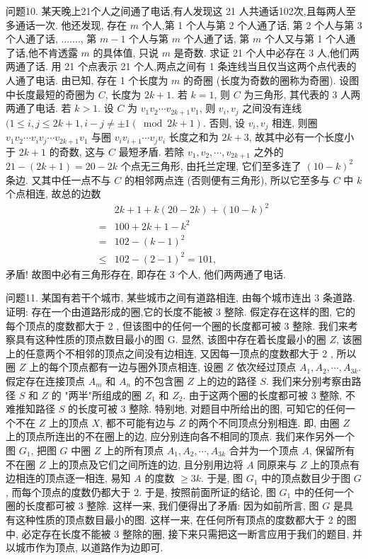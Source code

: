 问题10. 某天晚上21个人之间通了电话,有人发现这 21 人共通话102次,且每两人至多通话一次.
他还发现, 存在 $m$ 个人,第 1 个人与第 2 个人通了话, 第 2 个人与第 3 个人通了话, ......., 第 $m-1$ 个人与第 $m$ 个人通了话, 第 $m$ 个人又与第 1 个人通了话,他不肯透露 $m$ 的具体值, 只说 $m$ 是奇数.
求证 21 个人中必存在 3 人,他们两两通了话.
用 21 个点表示 21 个人,两点之间有 1 条连线当且仅当这两个点代表的人通了电话.
由已知, 存在 1 个长度为 $m$ 的奇圈 (长度为奇数的圈称为奇圈). 设图中长度最短的奇圈为 $C$, 长度为 $2 k+1$.
若 $k=1$, 则 $C$ 为三角形, 其代表的 3 人两两通了电话.
若 $k>1$. 设 $C$ 为 $v_1 v_2 \cdots v_{2 k+1} v_1$, 则 $v_i, v_j$ 之间没有连线 $(1 \leqslant i, j \leqslant 2 k+ 1, i-j \neq \pm 1(\bmod 2 k+1)$. 否则, 设 $v_i, v_j$ 相连, 则圈 $v_1 v_2 \cdots v_i v_j \cdots v_{2 k+1} v_1$ 与圈 $v_i v_{i+1} \cdots v_j v_i$ 长度之和为 $2 k+3$, 故其中必有一个长度小于 $2 k+1$ 的奇数, 这与 $C$ 最短矛盾.
若除 $v_1, v_2, \cdots, v_{2 k+1}$ 之外的 $21-(2 k+1)=20-2 k$ 个点无三角形, 由托兰定理, 它们至多连了 $(10-k)^2$ 条边.
又其中任一点不与 $C$ 的相邻两点连 (否则便有三角形), 所以它至多与 $C$ 中 $k$ 个点相连, 故总的边数
$$
\begin{aligned}
& 2 k+1+k(20-2 k)+(10-k)^2 \\
= & 100+2 k+1-k^2 \\
= & 102-(k-1)^2 \\
\leqslant & 102-(2-1)^2=101,
\end{aligned}
$$
矛盾!
故图中必有三角形存在, 即存在 3 个人, 他们两两通了电话.



问题11. 某国有若干个城市, 某些城市之间有道路相连, 由每个城市连出 3 条道路.
证明: 存在一个由道路形成的圈,它的长度不能被 3 整除.
假定存在这样的图, 它的每个顶点的度数都大于 2 , 但该图中的任何一个圈的长度都可被 3 整除.
我们来考察具有这种性质的顶点数目最小的图 G. 显然, 该图中存在着长度最小的圈 $Z$, 该圈上的任意两个不相邻的顶点之间没有边相连, 又因每一顶点的度数都大于 2 , 所以圈 $Z$ 上的每个顶点都有一边与圈外顶点相连, 设圈 $Z$ 依次经过顶点 $A_1, A_2, \cdots, A_{3 k}$. 假定存在连接顶点 $A_m$ 和 $A_n$ 的不包含圈 $Z$ 上的边的路径 $S$. 我们来分别考察由路径 $S$ 和 $Z$ 的 "两半"所组成的圈 $Z_1$ 和 $Z_2$. 由于这两个圈的长度都可被 3 整除, 不难推知路径 $S$ 的长度可被 3 整除.
特别地, 对题目中所给出的图, 可知它的任何一个不在 $Z$ 上的顶点 $X$, 都不可能有边与 $Z$ 的两个不同顶点分别相连.
即, 由圈 $Z$ 上的顶点所连出的不在圈上的边, 应分别连向各不相同的顶点.
我们来作另外一个图 $G_1$, 把图 $G$ 中圈 $Z$ 上的所有顶点 $A_1, A_2, \cdots, A_{3 k}$ 合并为一个顶点 $A$, 保留所有不在圈 $Z$ 上的顶点及它们之间所连的边, 且分别用边将 $A$ 同原来与 $Z$ 上的顶点有边相连的顶点逐一相连, 易知 $A$ 的度数 $\geqslant 3 k$. 于是, 图 $G_1$ 中的顶点数目少于图 $G$, 而每个顶点的度数仍都大于 2. 于是, 按照前面所证的结论, 图 $G_1$ 中的任何一个圈的长度都可被 3 整除.
这样一来, 我们便得出了矛盾: 因为如前所言, 图 $G$ 是具有这种性质的顶点数目最小的图.
这样一来, 在任何所有顶点的度数都大于 2 的图中, 必定存在长度不能被 3 整除的圈, 接下来只需把这一断言应用于我们的题目, 并以城市作为顶点, 以道路作为边即可.



